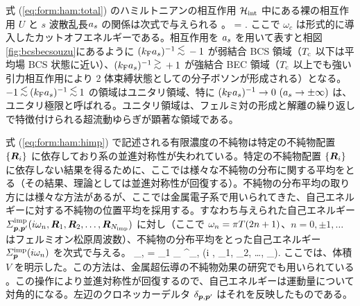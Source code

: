 式 (\ref{eq:form:ham:total}) のハミルトニアンの相互作用 $\mathcal{H}_{\text{int}}$ 中にある裸の相互作用 $U$ と $s$ 波散乱長$ a_s$ の関係は次式で与えられる \cite{ohashi2005}。
\beq
{} =  .\label{eq:form:ham:askf}
\eeq
ここで $\omega_c$ は形式的に導入したカットオフエネルギーである。相互作用を $a_s$ を用いて表すと相図 \ref{fig:bcsbecsouzu}にあるように $\askfi \ltsim -1$ が弱結合 BCS 領域（$T_{\text{c}}$ 以下は平均場 BCS 状態に近い）、$\askfi \gtsim +1$ が強結合 BEC 領域（$T_{\text{c}}$ 以上でも強い引力相互作用により 2 体束縛状態としての分子ボソンが形成される）となる。$-1 \ltsim \askfi \ltsim 1$ の領域はユニタリ領域、特に $(k_{\text{F}} a_s)^{-1} \to 0\  (a_s\to \pm\infty)$ は、ユニタリ極限と呼ばれる。ユニタリ領域は、フェルミ対の形成と解離の繰り返しで特徴付けられる超流動ゆらぎが顕著な領域である。

\label{sec:form:imp}

式 (\ref{eq:form:ham:himp}) で記述される有限濃度の不純物は特定の不純物配置 $\{\bm{R}_i\}$ に依存しており系の並進対称性が失われている。特定の不純物配置 $\{\bm{R}_i\}$ に依存しない結果を得るために、ここでは様々な不純物の分布に関する平均をとる（その結果、理論としては並進対称性が回復する）。不純物の分布平均の取り方には様々な方法があるが、ここでは金属電子系で用いられてきた、自己エネルギーに対する不純物の位置平均を採用する。すなわち与えられた自己エネルギー $\varSigma^{\text{imp}}_{\bm{p}, \bm{p}'}(i \omega_n, \bm{R}_1, \bm{R}_2, \dots, \bm{R}_{N_{\text{imp}}})$ に対し（ここで $\omega_n = \pi T(2 n + 1)$、$n=0, \pm1, \dots$ はフェルミオン松原周波数）、不純物の分布平均をとった自己エネルギー $\varSigma^{\text{imp}}_{\bm{p}}(i\omega_n)$ を次式で与える。
\beq
\sigimppom \delta_{\bp,\bpp} = \int \diff {}_1 \cdots \diff {}_{\nimp}  \sig^{\imp}_{\bp, \bpp}(i \omn, _1, _2, \dots, _{\nimp}).
\eeq
ここでは、体積 $V$ を明示した。この方法は、金属超伝導の不純物効果の研究でも用いられている \cite{abrikosov1961,shiba1968, shiba1973}。この操作により並進対称性が回復するので、自己エネルギーは運動量について対角的になる。左辺のクロネッカーデルタ $\delta_{\bm{p}, \bm{p}'}$ はそれを反映したものである。

